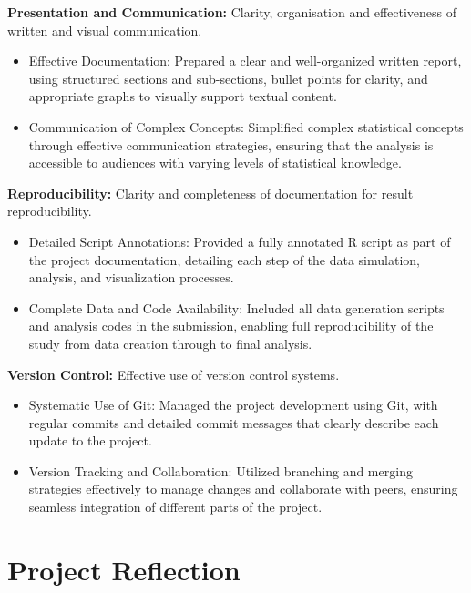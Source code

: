 \documentclass[a4paper, 12pt]{article}
\begin{document}
\textbf{Presentation and Communication:} Clarity, organisation and effectiveness of written and visual communication.

\begin{itemize}
    \item Effective Documentation: Prepared a clear and well-organized written report, using structured sections and sub-sections, bullet points for clarity, and appropriate graphs to visually support textual content.
    \item Communication of Complex Concepts: Simplified complex statistical concepts through effective communication strategies, ensuring that the analysis is accessible to audiences with varying levels of statistical knowledge.
\end{itemize}

\textbf{Reproducibility:} Clarity and completeness of documentation for result reproducibility.

\begin{itemize}
    \item Detailed Script Annotations: Provided a fully annotated R script as part of the project documentation, detailing each step of the data simulation, analysis, and visualization processes.
    \item Complete Data and Code Availability: Included all data generation scripts and analysis codes in the submission, enabling full reproducibility of the study from data creation through to final analysis.
\end{itemize}

\textbf{Version Control:} Effective use of version control systems.

\begin{itemize}
    \item Systematic Use of Git: Managed the project development using Git, with regular commits and detailed commit messages that clearly describe each update to the project.
    \item Version Tracking and Collaboration: Utilized branching and merging strategies effectively to manage changes and collaborate with peers, ensuring seamless integration of different parts of the project.
\end{itemize}

\pagebreak

\section{Project Reflection}
\end{document}
